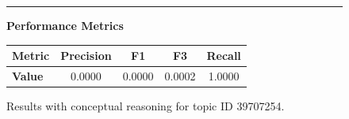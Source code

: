 \begin{figure}[p]
\begin{CombinedBox}
		\vspace{0.5em}
		\hrule
		\vspace{0.5em}
		
		\textbf{\small Performance Metrics}
		
		\vspace{0.3em}
		{\small
			\begin{tabular}{@{}lcccc@{}}
				\toprule
				\textbf{Metric} & Precision & F1 & F3 & Recall \\
				\midrule
				\textbf{Value} & 0.0000 & 0.0000 & 0.0002 & 1.0000 \\
				\bottomrule
			\end{tabular}
		}
	\end{CombinedBox}
	
	\caption{Results with conceptual reasoning for topic ID 39707254.}
	\label{fig:topic_39707254_conceptual_reasoning}
\end{figure}



